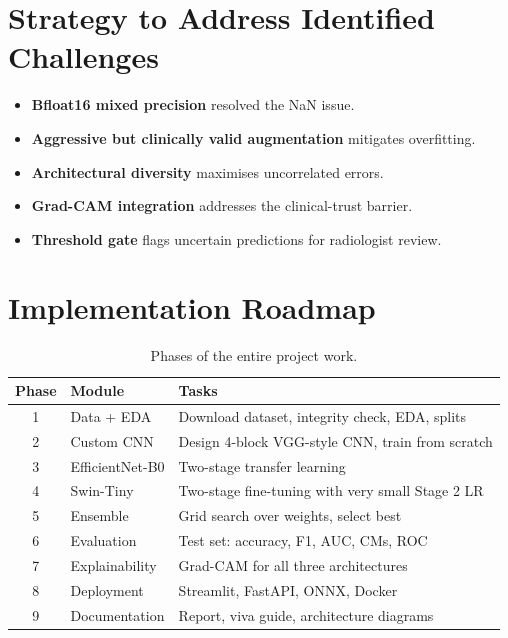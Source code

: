 \documentclass[12pt,a4paper,oneside]{report}
\begin{document}
\section{Strategy to Address Identified Challenges}

\begin{itemize}[leftmargin=*]
  \item \textbf{Bfloat16 mixed precision} resolved the NaN issue.
  \item \textbf{Aggressive but clinically valid augmentation} mitigates overfitting.
  \item \textbf{Architectural diversity} maximises uncorrelated errors.
  \item \textbf{Grad-CAM integration} addresses the clinical-trust barrier.
  \item \textbf{Threshold gate} flags uncertain predictions for radiologist review.
\end{itemize}

\section{Implementation Roadmap}

\begin{table}[H]
  \centering
  \caption{Phases of the entire project work.}
  \label{tab:phases}
  \begin{tabular}{cll}
    \toprule
    \textbf{Phase} & \textbf{Module} & \textbf{Tasks} \\
    \midrule
    1 & Data + EDA & Download dataset, integrity check, EDA, splits \\
    2 & Custom CNN & Design 4-block VGG-style CNN, train from scratch \\
    3 & EfficientNet-B0 & Two-stage transfer learning \\
    4 & Swin-Tiny & Two-stage fine-tuning with very small Stage 2 LR \\
    5 & Ensemble & Grid search over weights, select best \\
    6 & Evaluation & Test set: accuracy, F1, AUC, CMs, ROC \\
    7 & Explainability & Grad-CAM for all three architectures \\
    8 & Deployment & Streamlit, FastAPI, ONNX, Docker \\
    9 & Documentation & Report, viva guide, architecture diagrams \\
    \bottomrule
  \end{tabular}
\end{table}
\end{document}
